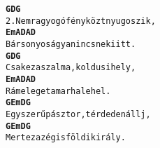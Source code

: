\begin{minipage}{\textwidth}
\kottastart
{}
\kottaend
\begin{minipage}{\textwidth}
\begin{multicols}{2}
\begin{minipage}{\textwidth}
\begin{alltt}
\textbf{    G                      D    G}
2. Nem ragyogó fény közt nyugoszik,
\textbf{    Em       A     D     A   D}
   Bársonyos ágya nincs neki itt.
\textbf{     G                   D    G}
   Csak ez a szalma, koldusi hely,
\textbf{    Em     A     D  A    D}
   Rá meleget a marha lehel.
\textbf{   G         Em       D       G}
   Egyszerű pásztor, térdeden állj,
\textbf{    G         Em     D       G}
   Mert ez az égi s földi király.
\end{alltt}
\vspace{0.0cm}
\versszakspacing
\end{minipage}
\vspace{0.2cm}
\end{multicols}
\end{minipage}

\end{minipage}
~\vspace{1.0cm}
\newline
